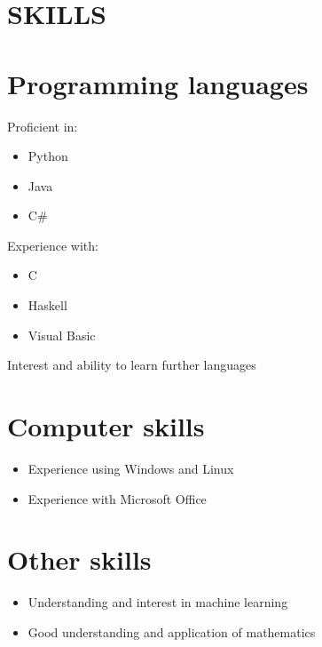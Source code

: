 \documentclass[margin]{res}
\begin{document}
\begin{resume}
\section{SKILLS}
\normalsize{\section{Programming languages}}
	Proficient in:
	\begin{itemize}
	\item Python
	\item Java
	\item C\#
	\end{itemize}
	Experience with:
	\begin{itemize}
	\item C
	\item Haskell
	\item Visual Basic
	\end{itemize}
	Interest and ability to learn further languages
\normalsize{\section{Computer skills}}
	\begin{itemize}
	\item Experience using Windows and Linux
	\item Experience with Microsoft Office
	\end{itemize}
\normalsize{\section{Other skills}}
	\begin{itemize}
	\item Understanding and interest in machine learning
	\item Good understanding and application of mathematics
	\end{itemize}


\end{resume}
\end{document}
